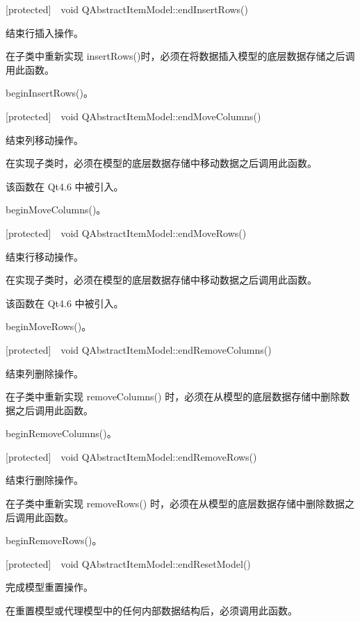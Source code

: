 [protected] void QAbstractItemModel::endInsertRows()

结束行插入操作。

在子类中重新实现 insertRows()时，必须在将数据插入模型的底层数据存储之后调用此函数。

\begin{seeAlso}
beginInsertRows()。
\end{seeAlso}

[protected] void QAbstractItemModel::endMoveColumns()

结束列移动操作。

在实现子类时，必须在模型的底层数据存储中移动数据之后调用此函数。

该函数在 Qt4.6 中被引入。

\begin{seeAlso}
beginMoveColumns()。
\end{seeAlso}

[protected] void QAbstractItemModel::endMoveRows()

结束行移动操作。

在实现子类时，必须在模型的底层数据存储中移动数据之后调用此函数。

该函数在 Qt4.6 中被引入。

\begin{seeAlso}
beginMoveRows()。
\end{seeAlso}

[protected] void QAbstractItemModel::endRemoveColumns()

结束列删除操作。

在子类中重新实现 removeColumns() 时，必须在从模型的底层数据存储中删除数据之后调用此函数。

\begin{seeAlso}
beginRemoveColumns()。
\end{seeAlso}

[protected] void QAbstractItemModel::endRemoveRows()

结束行删除操作。

在子类中重新实现 removeRows() 时，必须在从模型的底层数据存储中删除数据之后调用此函数。

\begin{seeAlso}
beginRemoveRows()。
\end{seeAlso}

[protected] void QAbstractItemModel::endResetModel()

完成模型重置操作。

在重置模型或代理模型中的任何内部数据结构后，必须调用此函数。

